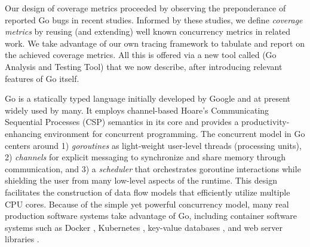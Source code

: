 Our design of coverage metrics proceeded
by observing the preponderance
of reported Go bugs in recent studies.
%
Informed by these studies,
we define {\em coverage metrics} by reusing
(and extending)
well known concurrency metrics in related work.
%
We take advantage of our own tracing framework to
tabulate and report on the achieved coverage metrics.
%
All this is offered via a new tool called \goat (Go Analysis and Testing Tool)
that we now describe, after introducing relevant features of Go
itself.

Go \cite{go} is a statically typed language initially developed by Google and at present widely used by many.
%
It employs channel-based Hoare's Communicating Sequential Processes (CSP) \cite{hoare-csp78} semantics in its core and provides a productivity-enhancing environment for concurrent programming.
%
The concurrent model in Go centers around
1) \textit{goroutines} as light-weight user-level threads (processing units),
2) \textit{channels} for explicit messaging to synchronize and share memory through communication, and
3) a \textit{scheduler} that orchestrates goroutine interactions while shielding
the user from
many low-level
aspects of the runtime.
%
This design
facilitates the
construction
of data flow models that efficiently utilize multiple CPU cores.
%
Because of the simple yet powerful concurrency model, many real production software systems take advantage of Go,
including
container software systems such as Docker \cite{merkel2014docker}, Kubernetes \cite{kubernetes},  key-value databases \cite{etcd}, and web server libraries \cite{grpc}.
%



